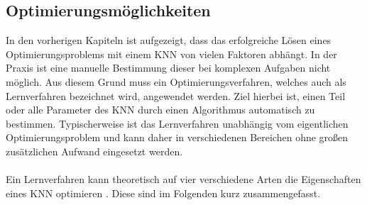 \subsection{Optimierungsmöglichkeiten}
\label{subsec:optimization_strategies}
In den vorherigen Kapiteln ist aufgezeigt, dass das erfolgreiche Lösen eines Optimierungsproblems mit einem \ac{KNN} von vielen Faktoren abhängt. In der Praxis ist eine manuelle Bestimmung dieser bei komplexen Aufgaben nicht möglich. Aus diesem Grund muss ein Optimierungsverfahren, welches auch als Lernverfahren bezeichnet wird, angewendet werden. Ziel hierbei ist, einen Teil oder alle Parameter des \ac{KNN} durch einen Algorithmus automatisch zu bestimmen. Typischerweise ist das Lernverfahren unabhängig vom eigentlichen Optimierungsproblem und kann daher in verschiedenen Bereichen ohne großen zusätzlichen Aufwand eingesetzt werden. 
\\\\
Ein Lernverfahren kann theoretisch auf vier verschiedene Arten die Eigenschaften eines \ac{KNN} optimieren \cite{zell2003simulation}. Diese sind im Folgenden kurz zusammengefasst.
